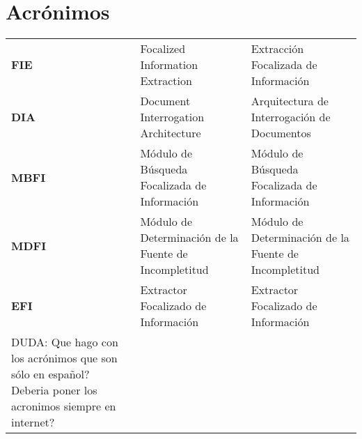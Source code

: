 \chapter*{Acrónimos}

\newcommand{\TERM}[3]{
	\textbf{#1} & #3 & #2 \\[5pt]
}

\begin{longtable}{p{1in}p{2.2in}p{3in}}

		\TERM{FIE}{Extracción Focalizada de Información}{Focalized Information Extraction}
		\TERM{DIA}{Arquitectura de Interrogación de Documentos}{Document Interrogation Architecture}
		\TERM{MBFI}{Módulo de Búsqueda Focalizada de Información}{Módulo de Búsqueda Focalizada de Información}
		\TERM{MDFI}{Módulo de Determinación de la Fuente de Incompletitud}{Módulo de Determinación de la Fuente de Incompletitud}		
		\TERM{EFI}{Extractor Focalizado de Información}{Extractor Focalizado de Información}								
		DUDA: Que hago con los acrónimos que son sólo en español? Deberia poner los acronimos siempre en internet?
\end{longtable}

\newpage
